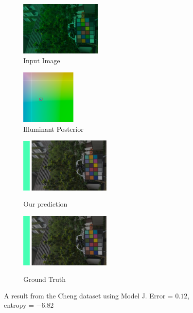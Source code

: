 \documentclass[10pt,twocolumn,letterpaper]{article}
\begin{document}
\begin{figure}[!]
\centering
  \begin{subfigure}[!]{1.7in}
    \includegraphics[width=1.6in]{figures/results/cheng/00000191_input.jpg}
    \caption{\footnotesize Input Image}
  \end{subfigure}
  \begin{subfigure}[!]{1.17in}
    \includegraphics[width=1.07in]{figures/results/cheng/00000191_chroma.png}
    \caption{\footnotesize Illuminant Posterior}
  \end{subfigure}
\begin{subfigure}[!]{1.9in}
    \includegraphics[width=0.133in]{figures/results/cheng/00000191_illum.png}\!
    \includegraphics[width=1.6in]{figures/results/cheng/00000191_prediction.jpg}
    \caption{\footnotesize Our prediction}
  \end{subfigure}
  \begin{subfigure}[!]{1.9in}
    \includegraphics[width=0.133in]{figures/results/cheng/00000191_illum_true.png}\!
    \includegraphics[width=1.6in]{figures/results/cheng/00000191_true.jpg}
    \caption{\footnotesize Ground Truth}
  \end{subfigure}
  \caption{
    A result from the Cheng dataset using Model J. Error = $0.12$\textdegree, entropy = $-6.82$
    \label{fig:results11}
  }
\end{figure}
\end{document}
